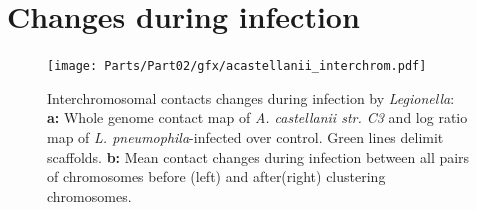 \section{Changes during infection}

\begin{figure}[b]
    \texttt{[image: Parts/Part02/gfx/acastellanii\_interchrom.pdf]}
    \caption[Interchromosomal contacts changes during infection by \textit{Legionella}.]{Interchromosomal contacts changes during infection by \textit{Legionella}: \textbf{a:} Whole genome contact map of \textit{A. castellanii str. C3} and log ratio map of \textit{L. pneumophila}-infected over control. Green lines delimit scaffolds. \textbf{b:} Mean contact changes during infection between all pairs of chromosomes before (left) and after(right) clustering chromosomes.}
	\label{fig:02-02:inter-infection}
\end{figure}


